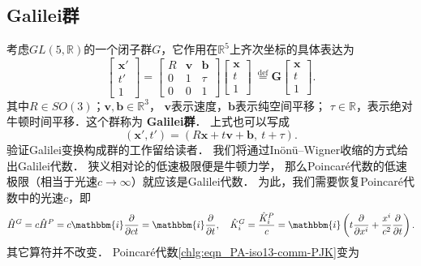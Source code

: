\subsection{Galilei群}\label{chlg:sec_Galilei-group}
考虑$GL(5, \mathbb{R})$的一个闭子群$G$，它作用在$\mathbb{R}^5$上齐次坐标的具体表达为
\begin{equation}\label{chlg:eqn_Galilei-max}
    \begin{bmatrix}  \boldsymbol{x}' \\ t'\\ 1 \end{bmatrix} =
    \begin{bmatrix}  R & \boldsymbol{v} & \boldsymbol{b} \\0 & 1 & \tau \\ 0 &0 & 1  \end{bmatrix}
    \begin{bmatrix}  \boldsymbol{x} \\t\\ 1 \end{bmatrix} 
    \  \overset{\mathrm {def}}{=} \boldsymbol{G} \begin{bmatrix}  \boldsymbol{x} \\ t\\ 1 \end{bmatrix} .
\end{equation}
其中$R \in S O(3)$；$\boldsymbol{v}, \boldsymbol{b} \in \mathbb{R}^3$，
$\boldsymbol{v}$表示速度，$\boldsymbol{b}$表示纯空间平移；
$\tau \in \mathbb{R}$，表示绝对牛顿时间平移．这个群称为 {\heiti\bfseries Galilei群}．
上式也可以写成
\begin{equation}
    (\boldsymbol{x}', t') = (R \boldsymbol{x}+t \boldsymbol{v}+ \boldsymbol{b},\ t+\tau) .
\end{equation}
验证Galilei变换构成群的工作留给读者．
我们将通过In\"on\"u--Wigner{\kaishu 收缩}的方式给出Galilei代数．
狭义相对论的低速极限便是牛顿力学，
那么Poincar\'{e}代数的低速极限（相当于光速$c\to \infty$）就应该是Galilei代数．
为此，我们需要恢复Poincar\'{e}代数中的光速$c$，即
\begin{equation}
    \hat{H}^G =c\hat{H}^P = c\mathbbm{i}\frac{\partial }{ \partial ct }
    = \mathbbm{i}\frac{\partial }{ \partial t }, \quad
    \hat{K}_i^G = \frac{\hat{K}_i^P}{c}= \mathbbm{i} \left(t\frac{\partial }{\partial x^i}+  
    \frac{x^i}{c^2}\frac{\partial }{\partial t}\right) .
\end{equation}
其它算符并不改变．
Poincar\'{e}代数\eqref{chlg:eqn_PA-iso13-comm-PJK}变为
